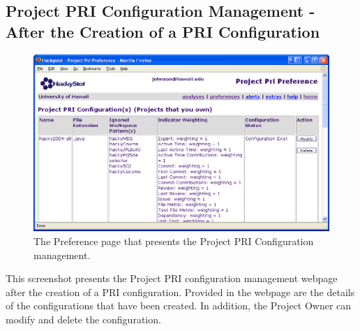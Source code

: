 \clearpage
\subsection{Project PRI Configuration Management - After the Creation of a 
  PRI Configuration}
\begin{figure}[ht]
  \centering
  \includegraphics[width=1.00\textwidth]{figs/UserInterface/preference-configAfterCreate-johnson.eps}
  \caption[Project PRI Configuration Management preference page]{The
    Preference page that presents the Project PRI Configuration management.}
  \label{fig:preference-configAfterCreate-johnson}
\end{figure}
This screenshot presents the Project PRI configuration management webpage
after the creation of a PRI configuration. Provided in the webpage are the
details of the configurations that have been created. In addition, the
Project Owner can modify and delete the configuration.



\clearpage
